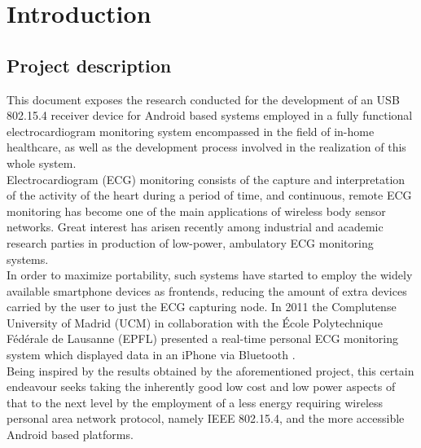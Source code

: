 \newcommand{\refer}[1]{\autoref{#1}, \emph{\nameref{#1}}}

\chapter{Introduction}
\label{cha:intro}
	\section{Project description}
	\label{sec:prj-descr}

		This document exposes the research conducted for the development of an USB 802.15.4 %
		receiver device for Android based systems employed in a fully 
		functional electrocardiogram monitoring system encompassed in the field of in-home healthcare,
		as well as the development process involved in the realization of this whole system.\\

		Electrocardiogram (ECG) monitoring consists of the capture and interpretation of the activity of the heart during a period of time, and continuous, remote ECG monitoring has become one of the main applications of wireless body sensor networks. Great interest has arisen recently among industrial and academic research parties in production of low-power, ambulatory ECG monitoring systems.\\

		In order to maximize portability, such systems have started to employ the widely available smartphone devices as frontends, reducing the amount of extra devices carried by the user to just the ECG capturing node. In 2011 the Complutense University of Madrid (UCM) in collaboration with the École Polytechnique Fédérale de Lausanne (EPFL) presented a real-time personal ECG monitoring system which displayed data in an iPhone via Bluetooth \cite{ESL}.\\

		Being inspired by the results obtained by the aforementioned project, this certain  endeavour seeks taking the inherently good low cost and low power aspects of that to the next level by the employment of a less energy requiring wireless personal area network protocol, namely IEEE 802.15.4, and the more accessible Android based platforms.\\

